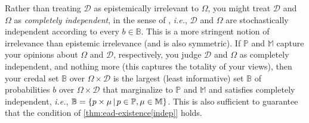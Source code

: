 \documentclass[a4paper]{article}
\renewcommand\P{\mathbb{P}} %
\newcommand{\D}{\mathcal{D}}
\newcommand{\IB}{\mathbb{B}}
\newcommand{\ID}{\mathbb{M}}
\newcommand{\IP}{\P}
\newcommand\SetDelimiter[1][]{
	\nonscript\,#1\vert \allowbreak \nonscript\,\mathopen{}}
\providecommand\given{\SetDelimiter}
\newcommand*\diff{\mathop{}\!\mathrm{d}}
\renewcommand{\geq}{\geqslant}
\newenvironment{CCM rewritten}
{\begingroup\color{blue}} %
{\endgroup}              %
\begin{document}
Rather than treating $\D$ as epistemically irrelevant to $\Omega$, you might treat $\D$ and $\Omega$ as \emph{completely independent}, in the sense of \cite{seidenfeld2007ci,cozman2012}, \emph{i.e.}, $\D$ and $\Omega$ are stochastically independent according to every $b\in\IB$. This is a more stringent notion of irrelevance than epistemic irrelevance (and is also symmetric). If $\IP$ and $\ID$ capture your opinions about $\Omega$ and $\D$, respectively, you judge $\D$ and $\Omega$ as completely independent, and nothing more (this captures the totality of your views), then your credal set $\IB$ over $\Omega \times \D$ is the largest (least informative) set $\IB$ of probabilities $b$ over $\Omega \times \D$ that marginalize to $\IP$ and $\ID$ and satisfies completely independent, \emph{i.e.}, $\IB=\left\{p\times\mu\given p\in\IP, \mu\in\ID\right\}$. This is also sufficient to guarantee that the condition of \cref{thm:ead-existence[indep]} holds.



 
\end{document}
